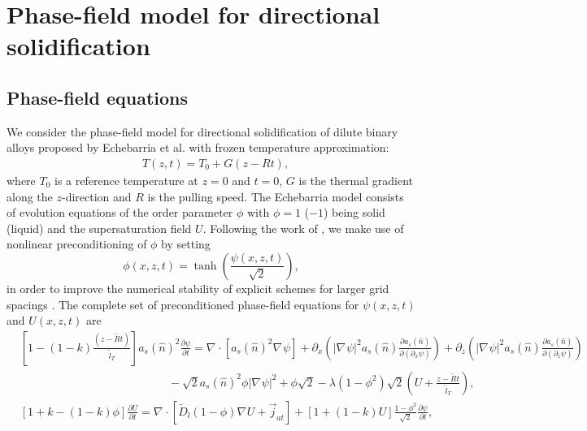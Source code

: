 \documentclass[final,times]{elsarticle}
\numberwithin{equation}{section}
\renewcommand{\div}[1]{\nabla_{#1} \cdot}
\newcommand{\grad}[1]{\nabla_{#1}}
\begin{document}
\section{Phase-field model for directional solidification}

\subsection{Phase-field equations}
We consider the phase-field model for directional solidification of dilute binary alloys proposed by Echebarria et al. \citep{Echebarria2004} with frozen temperature approximation:
\begin{align}
    & T(z,t) = T_0 + G(z-Rt),
\end{align}
where $T_0$ is a reference temperature at $z=0$ and $t=0$, $G$ is the thermal gradient along the $z$-direction and $R$ is the pulling speed. The Echebarria model consists of evolution equations of the order parameter $\phi$ with $\phi=1$ ($-1$) being solid (liquid)  and the supersaturation field $U$. Following the work of \cite{Tourret2015}, we make use of nonlinear preconditioning of $\phi$ by setting
\begin{equation}
\phi(x,z,t ) = \tanh \left(\frac{ \psi(x,z,t) }{\sqrt{2}} \right),
\end{equation} 
in order to improve the numerical stability of explicit schemes for larger grid spacings \cite{Glasner2001}.  The complete set of preconditioned phase-field equations for $\psi(x,z,t)$ and $U(x,z,t)$ are
\begin{align}
 & \left[1-(1-k) \frac{(z- \tilde{R} t)}{ \tilde{l}_T} \right] a_s(\hat{n})^2 \frac{\partial \psi}{\partial t} = \div{} [a_s(\hat{n})^2 \grad{} \psi] + \partial_x \left( |\grad{} \psi|^2 a_s(\hat{n}) \frac{\partial a_s(\hat{n})}{\partial (\partial_x \psi)}  \right)  + 
\partial_z \left( |\grad{} \psi|^2 a_s(\hat{n}) \frac{\partial a_s(\hat{n})}{\partial (\partial_z \psi)}  \right)   \nonumber  \\  
 &  \hspace{13em}  -\sqrt{2}a_s(\hat{n})^2\phi|\grad{} \psi|^2 + \phi \sqrt{2} - \lambda (1-\phi^2)\sqrt{2} \left(U + \frac{z-\tilde{R} t}{ \tilde{l}_T} \right),  \label{eq:psi} \\
& \left[ 1+k-(1-k)\phi \right] \frac{\partial U}{\partial t} =  \div{} [\tilde{D}_l (1-\phi) \grad{} U + \vec{j}_{at}] + [1+(1-k)U]\frac{1-\phi^{2}}{\sqrt{2}}  \frac{\partial \psi}{\partial t}, \label{eq:saturation}
\end{align}
\end{document}
